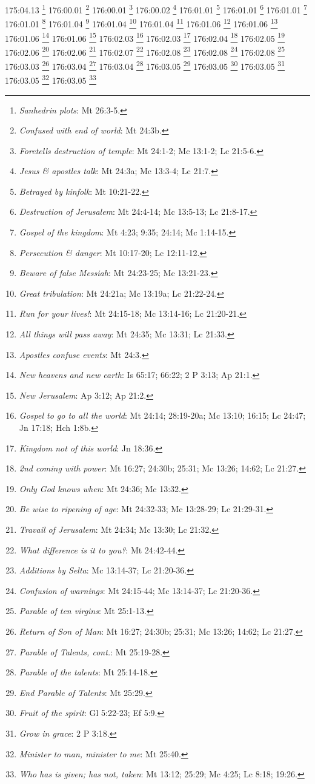 175:04.13 \footnote{\textit{Sanhedrin plots}: Mt 26:3-5.}
176:00.01 \footnote{\textit{Confused with end of world}: Mt 24:3b.}
176:00.01 \footnote{\textit{Foretells destruction of temple}: Mt 24:1-2; Mc 13:1-2; Lc 21:5-6.}
176:00.02 \footnote{\textit{Jesus & apostles talk}: Mt 24:3a; Mc 13:3-4; Lc 21:7.}
176:01.01 \footnote{\textit{Betrayed by kinfolk}: Mt 10:21-22.}
176:01.01 \footnote{\textit{Destruction of Jerusalem}: Mt 24:4-14; Mc 13:5-13; Lc 21:8-17.}
176:01.01 \footnote{\textit{Gospel of the kingdom}: Mt 4:23; 9:35; 24:14; Mc 1:14-15.}
176:01.01 \footnote{\textit{Persecution & danger}: Mt 10:17-20; Lc 12:11-12.}
176:01.04 \footnote{\textit{Beware of false Messiah}: Mt 24:23-25; Mc 13:21-23.}
176:01.04 \footnote{\textit{Great tribulation}: Mt 24:21a; Mc 13:19a; Lc 21:22-24.}
176:01.04 \footnote{\textit{Run for your lives!}: Mt 24:15-18; Mc 13:14-16; Lc 21:20-21.}
176:01.06 \footnote{\textit{All things will pass away}: Mt 24:35; Mc 13:31; Lc 21:33.}
176:01.06 \footnote{\textit{Apostles confuse events}: Mt 24:3.}
176:01.06 \footnote{\textit{New heavens and new earth}: Is 65:17; 66:22; 2 P 3:13; Ap 21:1.}
176:01.06 \footnote{\textit{New Jerusalem}: Ap 3:12; Ap 21:2.}
176:02.03 \footnote{\textit{Gospel to go to all the world}: Mt 24:14; 28:19-20a; Mc 13:10; 16:15; Lc 24:47; Jn 17:18; Hch 1:8b.}
176:02.03 \footnote{\textit{Kingdom not of this world}: Jn 18:36.}
176:02.04 \footnote{\textit{2nd coming with power}: Mt 16:27; 24:30b; 25:31; Mc 13:26; 14:62; Lc 21:27.}
176:02.05 \footnote{\textit{Only God knows when}: Mt 24:36; Mc 13:32.}
176:02.06 \footnote{\textit{Be wise to ripening of age}: Mt 24:32-33; Mc 13:28-29; Lc 21:29-31.}
176:02.06 \footnote{\textit{Travail of Jerusalem}: Mt 24:34; Mc 13:30; Lc 21:32.}
176:02.07 \footnote{\textit{What difference is it to you?}: Mt 24:42-44.}
176:02.08 \footnote{\textit{Additions by Selta}: Mc 13:14-37; Lc 21:20-36.}
176:02.08 \footnote{\textit{Confusion of warnings}: Mt 24:15-44; Mc 13:14-37; Lc 21:20-36.}
176:02.08 \footnote{\textit{Parable of ten virgins}: Mt 25:1-13.}
176:03.03 \footnote{\textit{Return of Son of Man}: Mt 16:27; 24:30b; 25:31; Mc 13:26; 14:62; Lc 21:27.}
176:03.04 \footnote{\textit{Parable of Talents, cont.}: Mt 25:19-28.}
176:03.04 \footnote{\textit{Parable of the talents}: Mt 25:14-18.}
176:03.05 \footnote{\textit{End Parable of Talents}: Mt 25:29.}
176:03.05 \footnote{\textit{Fruit of the spirit}: Gl 5:22-23; Ef 5:9.}
176:03.05 \footnote{\textit{Grow in grace}: 2 P 3:18.}
176:03.05 \footnote{\textit{Minister to man, minister to me}: Mt 25:40.}
176:03.05 \footnote{\textit{Who has is given; has not, taken}: Mt 13:12; 25:29; Mc 4:25; Lc 8:18; 19:26.}

